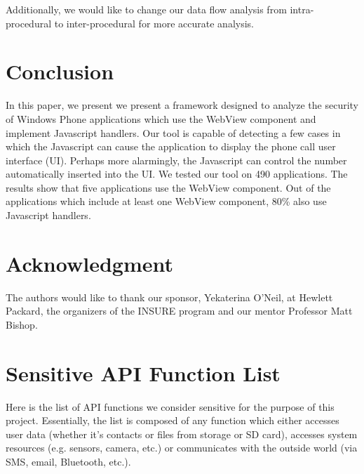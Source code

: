 \documentclass[conference]{IEEEtran}
\begin{document}
Additionally, we would like to change our data flow analysis from intra-procedural to inter-procedural for more accurate analysis.

\section{Conclusion}
In this paper, we present we present a framework designed to analyze the security of Windows Phone applications which use the WebView component and implement Javascript handlers. Our tool is capable of detecting a few cases in which the Javascript can cause the application to display the phone call user interface (UI). Perhaps more alarmingly, the Javascript can control the number automatically inserted into the UI. We tested our tool on 490 applications. The results show that five applications use the WebView component. Out of the applications which include at least one WebView component, 80\% also use Javascript handlers.

\section*{Acknowledgment}
The authors would like to thank our sponsor, Yekaterina O'Neil, at Hewlett Packard, the organizers of the INSURE program and our mentor Professor Matt Bishop.




\appendix
\section{Sensitive API Function List}
Here is the list of API functions we consider sensitive for the purpose of this project.
Essentially, the list is composed of any function which either accesses user data (whether it's contacts or files from storage or SD card), accesses system resources (e.g. sensors, camera, etc.) or communicates with the outside world (via SMS, email, Bluetooth, etc.).

\end{document}
